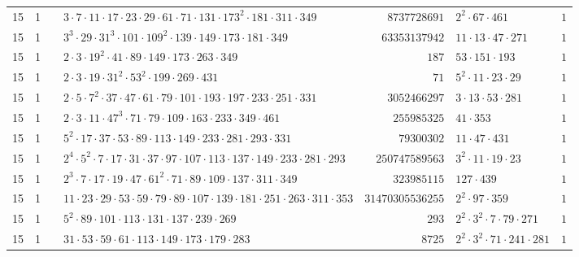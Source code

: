 \documentclass[a4paper,twoside,10pt]{report}
\renewcommand{\checkmark}{\text{\ding{51}}}
\newcommand{\cross}{\text{\ding{55}}}
\begin{document}
\begin{longtable}{rrcp{5cm}rp{5cm}r}
15 & 1 & \checkmark& $3 \cdot 7 \cdot 11 \cdot 17 \cdot 23 \cdot 29 \cdot 61 \cdot 71 \cdot 131 \cdot 173^{2} \cdot 181 \cdot 311 \cdot 349$ & $8737728691$ & $2^{2} \cdot 67 \cdot 461$ & $1$\\
15 & 1 & \checkmark& $3^{3} \cdot 29 \cdot 31^{3} \cdot 101 \cdot 109^{2} \cdot 139 \cdot 149 \cdot 173 \cdot 181 \cdot 349$ & $63353137942$ & $11 \cdot 13 \cdot 47 \cdot 271$ & $1$\\
15 & 1 & \cross& $2 \cdot 3 \cdot 19^{2} \cdot 41 \cdot 89 \cdot 149 \cdot 173 \cdot 263 \cdot 349$ & $187$ & $53 \cdot 151 \cdot 193$ & $1$\\
15 & 1 & \cross& $2 \cdot 3 \cdot 19 \cdot 31^{2} \cdot 53^{2} \cdot 199 \cdot 269 \cdot 431$ & $71$ & $5^{2} \cdot 11 \cdot 23 \cdot 29$ & $1$\\
15 & 1 & \checkmark& $2 \cdot 5 \cdot 7^{2} \cdot 37 \cdot 47 \cdot 61 \cdot 79 \cdot 101 \cdot 193 \cdot 197 \cdot 233 \cdot 251 \cdot 331$ & $3052466297$ & $3 \cdot 13 \cdot 53 \cdot 281$ & $1$\\
15 & 1 & \checkmark& $2 \cdot 3 \cdot 11 \cdot 47^{3} \cdot 71 \cdot 79 \cdot 109 \cdot 163 \cdot 233 \cdot 349 \cdot 461$ & $255985325$ & $41 \cdot 353$ & $1$\\
15 & 1 & \checkmark& $5^{2} \cdot 17 \cdot 37 \cdot 53 \cdot 89 \cdot 113 \cdot 149 \cdot 233 \cdot 281 \cdot 293 \cdot 331$ & $79300302$ & $11 \cdot 47 \cdot 431$ & $1$\\
15 & 1 & \checkmark& $2^{4} \cdot 5^{2} \cdot 7 \cdot 17 \cdot 31 \cdot 37 \cdot 97 \cdot 107 \cdot 113 \cdot 137 \cdot 149 \cdot 233 \cdot 281 \cdot 293$ & $250747589563$ & $3^{2} \cdot 11 \cdot 19 \cdot 23$ & $1$\\
15 & 1 & \checkmark& $2^{3} \cdot 7 \cdot 17 \cdot 19 \cdot 47 \cdot 61^{2} \cdot 71 \cdot 89 \cdot 109 \cdot 137 \cdot 311 \cdot 349$ & $323985115$ & $127 \cdot 439$ & $1$\\
15 & 1 & \checkmark& $11 \cdot 23 \cdot 29 \cdot 53 \cdot 59 \cdot 79 \cdot 89 \cdot 107 \cdot 139 \cdot 181 \cdot 251 \cdot 263 \cdot 311 \cdot 353$ & $31470305536255$ & $2^{2} \cdot 97 \cdot 359$ & $1$\\
15 & 1 & \cross& $5^{2} \cdot 89 \cdot 101 \cdot 113 \cdot 131 \cdot 137 \cdot 239 \cdot 269$ & $293$ & $2^{2} \cdot 3^{2} \cdot 7 \cdot 79 \cdot 271$ & $1$\\
15 & 1 & \cross& $31 \cdot 53 \cdot 59 \cdot 61 \cdot 113 \cdot 149 \cdot 173 \cdot 179 \cdot 283$ & $8725$ & $2^{2} \cdot 3^{2} \cdot 71 \cdot 241 \cdot 281$ & $1$\\

\end{longtable}
\end{document}
